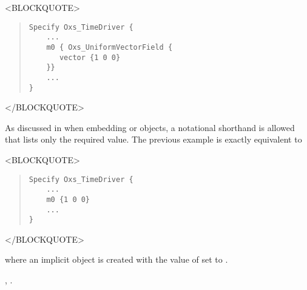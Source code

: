 \begin{description}
\begin{rawhtml}
<BLOCKQUOTE>
\end{rawhtml}
\begin{quote}
\begin{verbatim}
Specify Oxs_TimeDriver {
    ...
    m0 { Oxs_UniformVectorField {
       vector {1 0 0}
    }}
    ...
}
\end{verbatim}
\end{quote}
\begin{rawhtml}
</BLOCKQUOTE>
\end{rawhtml}
As discussed in
when embedding 
or 
objects, a notational shorthand is allowed that lists only the required
value.  The previous example is exactly equivalent to
\begin{rawhtml}
<BLOCKQUOTE>
\end{rawhtml}
\begin{quote}
\begin{verbatim}
Specify Oxs_TimeDriver {
    ...
    m0 {1 0 0}
    ...
}
\end{verbatim}
\end{quote}
\begin{rawhtml}
</BLOCKQUOTE>
\end{rawhtml}
where an implicit  object is
created with the value of  set to .

\begin{ExampleMifs}
  , .
\end{ExampleMifs}


\end{description}
